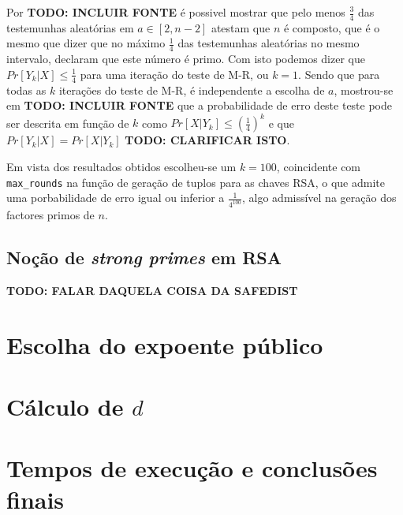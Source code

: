 \documentclass[dvipsnames]{article}
\begin{document}

\noindent Por \textbf{TODO: INCLUIR FONTE} é possivel mostrar que pelo menos $\frac{3}{4}$ das testemunhas aleatórias em $a \in [2,n-2]$ atestam que $n$ é composto, que é o mesmo que dizer que no máximo $\frac{1}{4}$ das testemunhas aleatórias no mesmo intervalo, declaram que este número é primo. Com isto podemos dizer que $Pr[Y_k|X] \leq \frac{1}{4}$ para uma iteração do teste de M-R, ou $k=1$. Sendo que para todas as $k$ iterações do teste de M-R, é independente a escolha de $a$, mostrou-se em \textbf{TODO: INCLUIR FONTE} que a probabilidade de erro deste teste pode ser descrita em função de $k$ como $Pr[X|Y_k] \leq (\frac{1}{4})^k$ e que $Pr[Y_k|X] = Pr[X|Y_k]$ \textbf{TODO: CLARIFICAR ISTO}.

\vskip 0.4cm

\noindent Em vista dos resultados obtidos escolheu-se um $k=100$, coincidente com \texttt{max\_rounds} na função de geração de tuplos para as chaves RSA, o que admite uma porbabilidade de erro igual ou inferior a $\frac{1}{4^{100}}$, algo admissível na geração dos factores primos de $n$.

\subsection{Noção de \textit{strong primes} em RSA}

\textbf{TODO: FALAR DAQUELA COISA DA SAFEDIST}

\section{Escolha do expoente público}

\section{Cálculo de $d$}

\section{Tempos de execução e conclusões finais}
\end{document}
